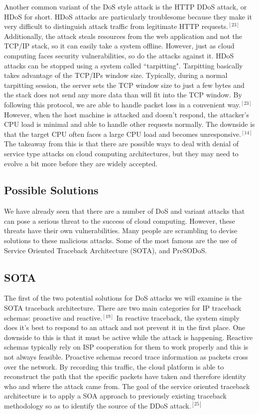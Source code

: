 \documentclass[a4paper, 8pt]{article} %
\begin{document}
\begin{doublespacing}
Another common variant of the DoS style attack is the HTTP DDoS attack, or HDoS for short.  HDoS attacks are particularly troublesome because they make it very difficult to distinguish attack traffic from legitimate HTTP requests.$^{[23]}$  Additionally, the attack steals resources from the web application and not the TCP/IP stack, so it can easily take a system offline.  However, just as cloud computing faces security vulnerabilities, so do the attacks against it.  HDoS attacks can be stopped using a system called ``tarpitting".  Tarpitting basically takes advantage of the TCP/IPs window size.  Typically, during a normal tarpitting session, the server sets the TCP window size to just a few bytes and the stack does not send any more data than will fit into the TCP window.  By following this protocol, we are able to handle packet loss in a convenient way.$^{[23]}$  However, when the host machine is attacked and doesn't respond, the attacker's CPU load is minimal and able to handle other requests normally.  The downside is that the target CPU often faces a large CPU load and becomes unresponsive.$^{[14]}$  The takeaway from this is that there are possible ways to deal with denial of service type attacks on cloud computing architectures, but they may need to evolve a bit more before they are widely accepted.  

\subsection*{Possible Solutions}

We have already seen that there are a number of DoS and variant attacks that can pose a serious threat to the success of cloud computing.  However, these threats have their own vulnerabilities.  Many people are scrambling to devise solutions to these malicious attacks.  Some of the most famous are the use of Service Oriented Traceback Architecture (SOTA), and PreSODoS.  

\subsection*{SOTA}

The first of the two potential solutions for DoS attacks we will examine is the SOTA traceback architecture.  There are two main categories for IP traceback schemas: proactive and reactive.$^{[19]}$  In reactive traceback, the system simply does it's best to respond to an attack and not prevent it in the first place.  One downside to this is that it must be active while the attack is happening.  Reactive schemas typically rely on ISP cooperation for them to work properly and this is not always feasible.  Proactive schemas record trace information as packets cross over the network.  By recording this traffic, the cloud platform is able to reconstruct the path that the specific packets have taken and therefore identity who and where the attack came from.  The goal of the service oriented traceback architecture is to apply a SOA approach to previously existing traceback methodology so as to identify the source of the DDoS attack.$^{[25]}$  


\end{doublespacing}
\end{document}
